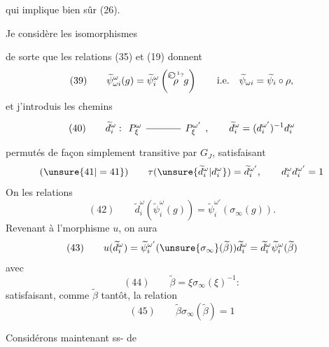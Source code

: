 qui implique bien sûr (26).

Je  considère les isomorphismes

de sorte que les relations (35) et (19) donnent
\[
(39)\qquad \widetilde\psi_{\omega i}^\omega(g)=\widetilde\psi_i^\omega\left(\overset{\text{\textcircled{$\scriptstyle\rho^{-1}?$}}}{\rho}g\right)
\qquad\text{i.e.}\quad\widetilde\psi_{\omega i}=\widetilde\psi_i\circ\rho,
\]
et j'introduis les chemins
\[
(40)\qquad\widetilde d_i^\omega:
\begin{tikzcd}[ampersand replacement=\&,column sep=large]
P_\xi^\omega\arrow[r,no head]\&P_\xi^{\omega'}
\end{tikzcd},\qquad
\widetilde d_i^\omega=(d_i^{\omega'})^{-1}d_i^\omega
\]
permutés de façon simplement transitive par $G_J$,
 satisfaisant
\[
(\unsure{41|=41})\qquad\tau(\unsure{\widetilde d_i^\omega|d_i^\omega})=\widetilde d_i^{\omega'},\qquad
d_i^\omega d_i^{\omega'}=1
\]
On   les relations
\[
(42)\qquad\widetilde d_i^\omega(\widetilde\psi_i^\omega(g))=
\widetilde\psi_i^{\omega'}(\sigma_\infty(g)).
\]
Revenant à l'morphisme $u$, on aura 
\[
(43)\qquad u(\widetilde d_i^\omega)=\widetilde\psi_i^{\omega'}(\unsure{\sigma_\infty}(\widetilde\beta))\widetilde d_i^\omega
=\widetilde d_i^\omega\widetilde\psi_i^\omega(\widetilde\beta)
\]
avec
\[
(44)\qquad\widetilde\beta=\xi\sigma_\infty(\xi)^{-1}:
\]
satisfaisant,   comme $\widetilde\beta$ tantôt, la relation
\[
(45)\qquad\widetilde\beta\sigma_\infty(\widetilde\beta)=1
\]

Considérons maintenant  ss- de
